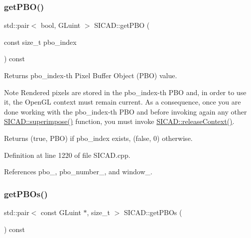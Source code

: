\subsubsection{\texorpdfstring{get\+P\+B\+O()}{getPBO()}}
{\footnotesize\ttfamily std\+::pair$<$ bool, G\+Luint $>$ S\+I\+C\+A\+D\+::get\+P\+BO (\begin{DoxyParamCaption}\item[{const size\+\_\+t}]{pbo\+\_\+index }\end{DoxyParamCaption}) const}



Returns {\ttfamily pbo\+\_\+index}-\/th Pixel Buffer Object (P\+BO) value. 

\begin{DoxyNote}{Note}
Rendered pixels are stored in the {\ttfamily pbo\+\_\+index}-\/th P\+BO and, in order to use it, the Open\+GL context must remain current. As a consequence, once you are done working with the {\ttfamily pbo\+\_\+index}-\/th P\+BO and before invoking again any other {\ttfamily \mbox{\hyperlink{classSICAD_a356e0ac8a0f130952a72326bedd4ab60}{S\+I\+C\+A\+D\+::superimpose()}}} function, you must invoke {\ttfamily \mbox{\hyperlink{classSICAD_ae626fa7f8fd4dc5fc4bdc4f5311beede}{S\+I\+C\+A\+D\+::release\+Context()}}}.
\end{DoxyNote}
\begin{DoxyReturn}{Returns}
(true, P\+BO) if {\ttfamily pbo\+\_\+index} exists, (false, 0) otherwise. 
\end{DoxyReturn}


Definition at line 1220 of file S\+I\+C\+A\+D.\+cpp.



References pbo\+\_\+, pbo\+\_\+number\+\_\+, and window\+\_\+.

\mbox{\label{classSICAD_a02c1c9f6c83bd9df278cdcfdaa78ccf4}} 
\subsubsection{\texorpdfstring{get\+P\+B\+Os()}{getPBOs()}}
{\footnotesize\ttfamily std\+::pair$<$ const G\+Luint $\ast$, size\+\_\+t $>$ S\+I\+C\+A\+D\+::get\+P\+B\+Os (\begin{DoxyParamCaption}{ }\end{DoxyParamCaption}) const}



